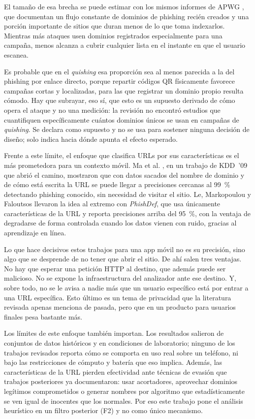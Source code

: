 El tamaño de esa brecha se puede estimar con los mismos informes de APWG
\cite{apwg2024q1,apwg2025q1}, que documentan un flujo constante de dominios de
phishing recién creados y una porción importante de sitios que duran menos de lo que
toma indexarlos. Mientras más ataques usen dominios registrados especialmente para una
campaña, menos alcanza a cubrir cualquier lista en el instante en que el usuario
escanea.

Es probable que en el \emph{quishing} esa proporción sea al menos parecida a la del
phishing por enlace directo, porque repartir códigos QR físicamente favorece campañas
cortas y localizadas, para las que registrar un dominio propio resulta cómodo. Hay que
subrayar, eso sí, que esto es un supuesto derivado de cómo opera el ataque y no una
medición: la revisión no encontró estudios que cuantifiquen específicamente cuántos
dominios únicos se usan en campañas de \emph{quishing}. Se declara como supuesto y no
se usa para sostener ninguna decisión de diseño; solo indica hacia dónde apunta el
efecto esperado.

Frente a este límite, el enfoque que clasifica URLs por sus características es el más
prometedora para un contexto móvil. Ma et al. \cite{ma2009beyond}, en un trabajo de
KDD~'09 que abrió el camino, mostraron que con datos sacados del nombre de dominio y
de cómo está escrita la URL se puede llegar a precisiones cercanas al 99~\% detectando
phishing conocido, sin necesidad de visitar el sitio. Le, Markopoulou y Faloutsos
\cite{le2011phishdef} llevaron la idea al extremo con \emph{PhishDef}, que usa
únicamente características de la URL y reporta precisiones arriba del 95~\%, con la
ventaja de degradarse de forma controlada cuando los datos vienen con ruido, gracias al
aprendizaje en línea.

Lo que hace decisivos estos trabajos para una app móvil no es su precisión, sino algo
que se desprende de no tener que abrir el sitio. De ahí salen tres ventajas. No hay que
esperar una petición HTTP al destino, que además puede ser malicioso. No se expone la
infraestructura del analizador ante ese destino. Y, sobre todo, no se le avisa a nadie
más que un usuario específico está por entrar a una URL específica. Esto último es un
tema de privacidad que la literatura revisada apenas menciona de pasada, pero que en un
producto para usuarios finales pesa bastante más.

Los límites de este enfoque también importan. Los resultados salieron de conjuntos de
datos históricos y en condiciones de laboratorio; ninguno de los trabajos revisados
reporta cómo se comporta en uso real sobre un teléfono, ni bajo las restricciones de
cómputo y batería que eso implica. Además, las características de la URL pierden
efectividad ante técnicas de evasión que trabajos posteriores ya documentaron: usar
acortadores, aprovechar dominios legítimos comprometidos o generar nombres por
algoritmo que estadísticamente se ven igual de inocentes que los normales. Por eso este
trabajo pone el análisis heurístico en un filtro posterior (F2) y no como único
mecanismo.

